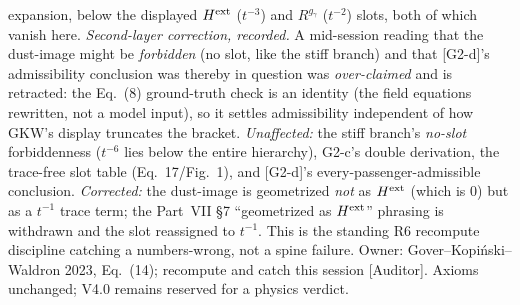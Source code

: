 \documentclass[11pt]{article}
\begin{document}
{expansion, below the displayed $H^{\rm ext}$ ($t^{-3}$) and $R^{g_\gamma}$ ($t^{-2}$) slots, both of which vanish here. \emph{Second-layer correction, recorded.} A mid-session reading that the dust-image might be \emph{forbidden} (no slot, like the stiff branch) and that [G2-d]'s admissibility conclusion was thereby in question was \emph{over-claimed} and is retracted: the Eq.~(8) ground-truth check is an identity (the field equations rewritten, not a model input), so it settles admissibility independent of how GKW's display truncates the bracket. \emph{Unaffected:} the stiff branch's \emph{no-slot} forbiddenness ($t^{-6}$ lies below the entire hierarchy), G2-c's double derivation, the trace-free slot table (Eq.~17/Fig.~1), and [G2-d]'s every-passenger-admissible conclusion. \emph{Corrected:} the dust-image is geometrized \emph{not} as $H^{\rm ext}$ (which is $0$) but as a $t^{-1}$ trace term; the Part~VII \S7 ``geometrized as $H^{\rm ext}$'' phrasing is withdrawn and the slot reassigned to $t^{-1}$. This is the standing R6 recompute discipline catching a numbers-wrong, not a spine failure. Owner: Gover--Kopi\'nski--Waldron 2023, Eq.~(14); recompute and catch this session [Auditor]. Axioms unchanged; V4.0 remains reserved for a physics verdict.

}
\end{document}
